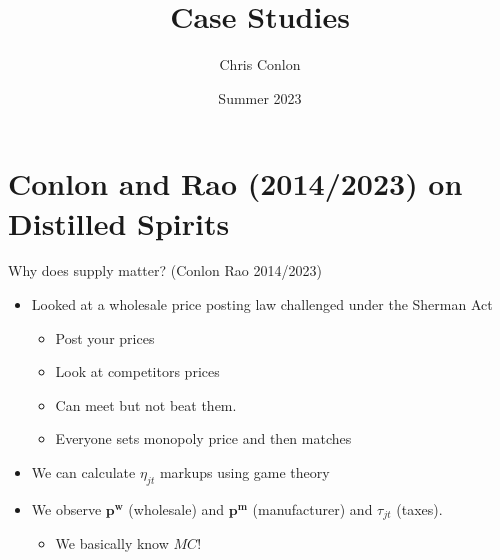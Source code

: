 

\usepackage{lipsum}
\usepackage{amsmath} 
\usepackage{amsthm} 
\usepackage{amssymb} 
\usepackage{mathtools}
\usepackage{dutchcal}


\newcommand{\vect}[1]{\symbf{\symbf{#1}}}
\newcommand{\pd}[2]{\frac{\partial{#1}}{\partial{#2}}}
\newcommand{\expect}[2]{\mathbb{E}_{#1}\left[{#2}\right]}
\newcommand{\expectsmall}[2]{\mathbb{E}_{#1}{#2}}
\newcommand{\expectsuper}[3]{\mathbb{E}_{#1}^{#2}\left[{#3}\right]}
\newcommand{\ind}[1]{\mathbbm{1}\left\{{#1}\right\}}
\newcommand{\prob}[1]{\mathbb{P}\left\{{#1}\right\}}
\newcommand{\derivative}[2]{\frac{d{#2}}{d{#1}}}
\newcommand{\cat}[1]{\citeasnoun{#1}}

\title{Case Studies}
\author{Chris Conlon}

\date{Summer 2023}








\begin{frame}[plain] %
\titlepage
\end{frame}



\section*{Conlon and Rao (2014/2023) on Distilled Spirits}



\begin{frame}{Why does supply matter? (Conlon Rao 2014/2023)}
\begin{itemize}
\item Looked at a wholesale price posting law challenged under the Sherman Act
\begin{itemize}
\item Post your prices
\item Look at competitors prices
\item Can meet but not beat them.
\item \textrightarrow Everyone sets monopoly price and then matches
\end{itemize}
\item We can calculate $\eta_{jt}$ markups using game theory
\item We observe $\symbf{p^w}$ (wholesale) and $\symbf{p^m}$ (manufacturer) and $\tau_{jt}$ (taxes).
\begin{itemize}
\item We basically know $MC$!
\end{itemize}
\end{itemize}
\end{frame}






